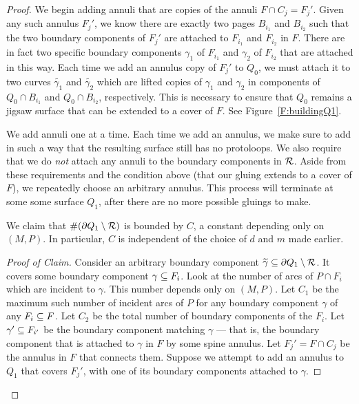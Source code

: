\begin{proof}
We begin adding annuli that are copies of the annuli $F \cap C_j = F_j'$. Given
any such annulus $F_j'$, we know there are exactly two pages $B_{i_1}$ and
$B_{i_2}$ such that the two boundary components of $F_j'$ are attached to
$F_{i_1}$ and $F_{i_2}$ in $F$.  There are in fact two specific boundary
components $\gamma_1$ of $F_{i_1}$ and $\gamma_2$ of $F_{i_2}$ that are
attached in this way.  Each time we add an annulus copy of $F_j'$ to $Q_0$, we
must attach it to two curves $\widetilde{\gamma_1}$ and $\widetilde{\gamma_2}$
which are lifted copies of $\gamma_1$ and $\gamma_2$ in components of $Q_0 \cap
B_{i_1}$ and $Q_0 \cap B_{i_2}$, respectively.  This is necessary to ensure
that $Q_0$ remains a jigsaw surface that can be extended to a cover of $F$. See
Figure~\ref{F:buildingQ1}.


We add annuli one at a time. Each time we add an annulus, we make sure to add
in such a way that the resulting surface still has no protoloops. We also
require that we do \emph{not} attach any annuli to the boundary components in
$\mathcal{R}$.  Aside from these requirements and the condition above (that our gluing
extends to a cover of $F$), we repeatedly choose an arbitrary annulus. This
process will terminate at some some surface $Q_1$, after there are no more
possible gluings to make.

\begin{claim}

We claim that $\#(\partial Q_1 \setminus \mathcal{R})$ is bounded by $C$, a constant
depending only on $(M,P)$. In particular, $C$ is independent of the choice of
$d$ and $m$ made earlier.

\end{claim}

\begin{proof}[Proof of Claim]

Consider an arbitrary boundary component $\widetilde{\gamma} \subseteq \partial Q_1
\setminus \mathcal{R}$.  It covers some boundary component $\gamma \subseteq F_i$. Look at
the number of arcs of $P \cap F_i$ which are incident to $\gamma$. This number
depends only on $(M,P)$. Let $C_1$ be the maximum such number of incident arcs
of $P$ for any boundary component $\gamma$ of any $F_i \subseteq F$. Let $C_2$ be
the total number of boundary components of the $F_i$. Let $\gamma' \subseteq F_{i'}$
be the boundary component matching $\gamma$ --- that is, the boundary component
that is attached to $\gamma$ in $F$ by some spine annulus. Let $F_j'= F \cap
C_j$ be the annulus in $F$ that connects them.  Suppose we attempt to add an
annulus to $Q_1$ that covers $F_j'$, with one of its boundary components
attached to $\gamma$.


\end{proof}
\end{proof}
